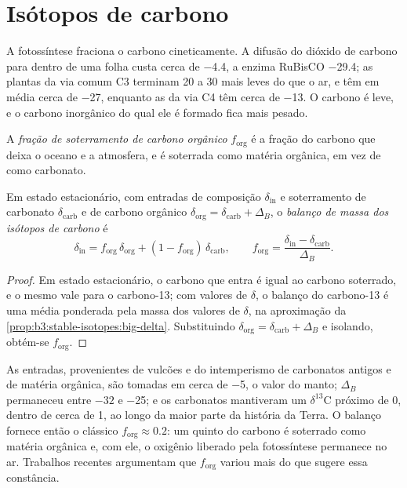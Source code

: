 \section{Isótopos de carbono}\label{sec:b3:stable-isotopes:carbon}

A fotossíntese fraciona o carbono cineticamente. A difusão do
dióxido de carbono para dentro de uma folha custa cerca de \qty{-4.4}{\permil}, a enzima RuBisCO
\qty{-29.4}{\permil}; as plantas da via comum C3 terminam \num{20} a
\qty{30}{\permil} mais leves do que o ar, e têm em média cerca de
\qty{-27}{\permil}, enquanto as da via C4 têm cerca de \qty{-13}{\permil}. O
carbono é leve, e o carbono inorgânico do qual ele é formado fica mais pesado.

\begin{definition}\label{def:b3:stable-isotopes:forg}
A \emph{fração de soterramento de carbono orgânico}
$f_{\mathrm{org}}$ é a fração do carbono que deixa o oceano e a
atmosfera, e é soterrada como matéria orgânica, em vez de como carbonato.
\end{definition}

\begin{proposition}\label{prop:b3:stable-isotopes:forg}
Em estado estacionário, com entradas de composição $\delta_{\mathrm{in}}$ e soterramento de
carbonato $\delta_{\mathrm{carb}}$ e de carbono orgânico $\delta_{\mathrm{org}} =
\delta_{\mathrm{carb}} + \Delta_B$, o \emph{balanço de massa dos isótopos de
carbono} é
\[
\delta_{\mathrm{in}} = f_{\mathrm{org}}\,\delta_{\mathrm{org}} + (1 - f_{\mathrm{org}})\,
\delta_{\mathrm{carb}}, \qquad f_{\mathrm{org}} = \frac{\delta_{\mathrm{in}} -
\delta_{\mathrm{carb}}}{\Delta_B}.
\]
\end{proposition}

\begin{proof}
Em estado estacionário, o carbono que entra é igual ao carbono soterrado, e o
mesmo vale para o carbono-13; com valores de $\delta$, o balanço do carbono-13
é uma média ponderada pela massa dos valores de $\delta$, na aproximação
da \cref{prop:b3:stable-isotopes:big-delta}. Substituindo $\delta_{\mathrm{org}} =
\delta_{\mathrm{carb}} + \Delta_B$ e isolando, obtém-se $f_{\mathrm{org}}$.
\end{proof}

As entradas, provenientes de vulcões e do intemperismo de carbonatos antigos e
de matéria orgânica, são tomadas em cerca de \qty{-5}{\permil}, o valor do manto; $\Delta_B$
permaneceu entre $-32$ e \qty{-25}{\permil}; e os carbonatos mantiveram um
$\delta^{13}\mathrm C$ próximo de 0, dentro de cerca de \qty{1}{\permil}, ao longo da maior
parte da história da Terra. O balanço fornece então o clássico $f_{\mathrm{org}} \approx
0.2$: um quinto do carbono é soterrado como matéria orgânica e, com ele, o
oxigênio liberado pela fotossíntese permanece no ar. Trabalhos recentes argumentam que
$f_{\mathrm{org}}$ variou mais do que sugere essa constância.

